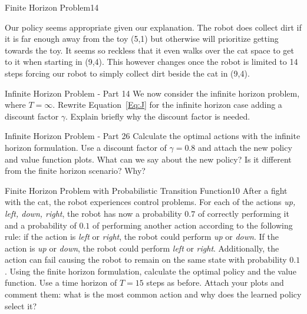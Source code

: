 \begin{questions}
\begin{question}{Finite Horizon Problem}{14}
\begin{answer}
	Our policy seems appropriate given our explanation. The robot does collect dirt if it is far enough away from the toy (5,1) but otherwise will prioritize getting towards the toy. It seems so reckless that it even walks over the cat space to get to it when starting in (9,4). This however changes once the robot is limited to 14 steps forcing our robot to simply collect dirt beside the cat in (9,4). 
\end{answer}

\end{question}



\begin{question}{Infinite Horizon Problem - Part 1}{4}
We now consider the infinite horizon problem, where $T=\infty$. Rewrite Equation~\eqref{Eq:J} for the infinite horizon case adding a discount factor $\gamma$. Explain briefly why the discount factor is needed.

\begin{answer}\end{answer}

\end{question}



\begin{question}{Infinite Horizon Problem - Part 2}{6}
Calculate the optimal actions with the infinite horizon formulation. Use a discount factor of $\gamma=0.8$ and attach the new policy and value function plots.
What can we say about the new policy? Is it different from the finite horizon scenario? Why?

\begin{answer}\end{answer}

\end{question}



\begin{question}{Finite Horizon Problem with Probabilistic Transition Function}{10}
After a fight with the cat, the robot experiences control problems. 
For each of the actions \textit{up, left, down, right}, the robot has now a probability $0.7$ of correctly performing it and a probability of $0.1$ of performing another action according to the following rule: if the action is \textit{left} or \textit{right}, the robot could perform \textit{up} or \textit{down}. If the action is \textit{up} or \textit{down}, the robot could perform \textit{left} or \textit{right}.
Additionally, the action can fail causing the robot to remain on the same state with probability $0.1$.
Using the finite horizon formulation, calculate the optimal policy and the value function. Use a time horizon of $T=15$ steps as before. Attach your plots and comment them: what is the most common action and why does the learned policy select it?


\end{question}
\end{questions}
